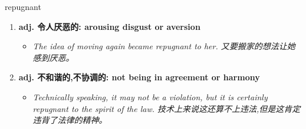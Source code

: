 
\begin{frame}
{\huge repugnant}
\begin{center}
\begin{enumerate}\Large
  \item \textbf{adj. 令人厌恶的: arousing disgust or aversion}
  \begin{itemize}
    \item \em{\Large{The idea of moving again became repugnant to her. 又要搬家的想法让她感到厌恶。}}
  \end{itemize}
  \item \textbf{adj. 不和谐的,不协调的: not being in agreement or harmony}
  \begin{itemize}
    \item \em{\Large{Technically speaking, it may not be a violation, but it is certainly repugnant to the spirit of the law. 技术上来说这还算不上违法,但是这肯定违背了法律的精神。}}
  \end{itemize}
\end{enumerate}
\end{center}
\end{frame}
